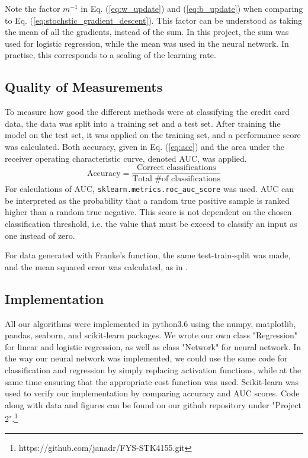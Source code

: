 Note the factor $m^{-1}$ in Eq. (\ref{eq:w_update}) and (\ref{eq:b_update}) when comparing to Eq. (\ref{eq:stochstic_gradient_descent}). This factor can be understood as taking the mean of all the gradients, instead of the sum. In this project, the sum was used for logistic regression, while the mean was used in the neural network. In practise, this corresponds to a scaling of the learning rate.

\subsection{Quality of Measurements}
To measure how good the different methods were at classifying the credit card data, the data was split into a training set and a test set. After training the model on the test set, it was applied on the training set, and a performance score was calculated. Both accuracy, given in Eq. (\ref{eq:acc}) and the area under the receiver operating characteristic curve, denoted AUC, was applied.
\begin{equation}\label{eq:acc}
  \text{Accuracy} = \frac{\text{Correct classifications}}{\text{Total \# of classifications}}
\end{equation}
For calculations of AUC, \texttt{sklearn.metrics.roc\_auc\_score} was used. AUC can be interpreted as the probability that a random true positive sample is ranked higher than a random true negative. This score is not dependent on the chosen classification threshold, i.e. the value that must be exceed to classify an input as one instead of zero.

For data generated with Franke's function, the same test-train-split was made, and the mean squared error was calculated, as in \cite{prosjekt1}.

\subsection{Implementation}
All our algorithms were implemented in python3.6 using the numpy, matplotlib, pandas, seaborn,
and scikit-learn packages. We wrote our own class "Regression" for linear and logistic
regression, as well as class "Network" for neural network. In the way our neural network was implemented, we could use the same code for classification and regression by simply replacing activation functions, while at the same time ensuring that the appropriate cost function was used.
Scikit-learn was used to verify our implementation by comparing accuracy and AUC scores.
Code along with data and figures can be found on our github repository under "Project 2".\footnote{https://github.com/janadr/FYS-STK4155.git}
